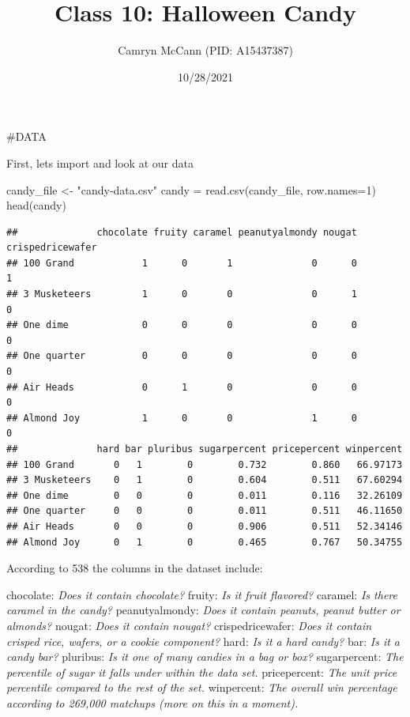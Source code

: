 \documentclass[
]{article}
\title{Class 10: Halloween Candy}
\author{Camryn McCann (PID: A15437387)}
\date{10/28/2021}
\newenvironment{Shaded}{\begin{snugshade}}{\end{snugshade}}
\newcommand{\AttributeTok}[1]{\textcolor[rgb]{0.77,0.63,0.00}{#1}}
\newcommand{\DecValTok}[1]{\textcolor[rgb]{0.00,0.00,0.81}{#1}}
\newcommand{\FunctionTok}[1]{\textcolor[rgb]{0.00,0.00,0.00}{#1}}
\newcommand{\NormalTok}[1]{#1}
\newcommand{\OtherTok}[1]{\textcolor[rgb]{0.56,0.35,0.01}{#1}}
\newcommand{\StringTok}[1]{\textcolor[rgb]{0.31,0.60,0.02}{#1}}
\begin{document}
\maketitle

\#DATA

First, lets import and look at our data

\begin{Shaded}
\begin{Highlighting}[]
\NormalTok{candy\_file }\OtherTok{\textless{}{-}} \StringTok{"candy{-}data.csv"}
\NormalTok{candy }\OtherTok{=} \FunctionTok{read.csv}\NormalTok{(candy\_file, }\AttributeTok{row.names=}\DecValTok{1}\NormalTok{)}
\FunctionTok{head}\NormalTok{(candy)}
\end{Highlighting}
\end{Shaded}

\begin{verbatim}
##              chocolate fruity caramel peanutyalmondy nougat crispedricewafer
## 100 Grand            1      0       1              0      0                1
## 3 Musketeers         1      0       0              0      1                0
## One dime             0      0       0              0      0                0
## One quarter          0      0       0              0      0                0
## Air Heads            0      1       0              0      0                0
## Almond Joy           1      0       0              1      0                0
##              hard bar pluribus sugarpercent pricepercent winpercent
## 100 Grand       0   1        0        0.732        0.860   66.97173
## 3 Musketeers    0   1        0        0.604        0.511   67.60294
## One dime        0   0        0        0.011        0.116   32.26109
## One quarter     0   0        0        0.011        0.511   46.11650
## Air Heads       0   0        0        0.906        0.511   52.34146
## Almond Joy      0   1        0        0.465        0.767   50.34755
\end{verbatim}

According to 538 the columns in the dataset include:

chocolate: \emph{Does it contain chocolate?} fruity: \emph{Is it fruit
flavored?} caramel: \emph{Is there caramel in the candy?}
peanutyalmondy: \emph{Does it contain peanuts, peanut butter or
almonds?} nougat: \emph{Does it contain nougat?} crispedricewafer:
\emph{Does it contain crisped rice, wafers, or a cookie component?}
hard: \emph{Is it a hard candy?} bar: \emph{Is it a candy bar?}
pluribus: \emph{Is it one of many candies in a bag or box?}
sugarpercent: \emph{The percentile of sugar it falls under within the
data set.} pricepercent: \emph{The unit price percentile compared to the
rest of the set.} winpercent: \emph{The overall win percentage according
to 269,000 matchups (more on this in a moment).}
\end{document}
